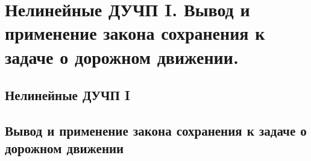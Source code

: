 \chapter{Нелинейные ДУЧП I. Вывод и применение закона сохранения к задаче о
дорожном движении.}

\section{Нелинейные ДУЧП I}
\section{Вывод и применение закона сохранения к задаче о дорожном движении}

\newpage
